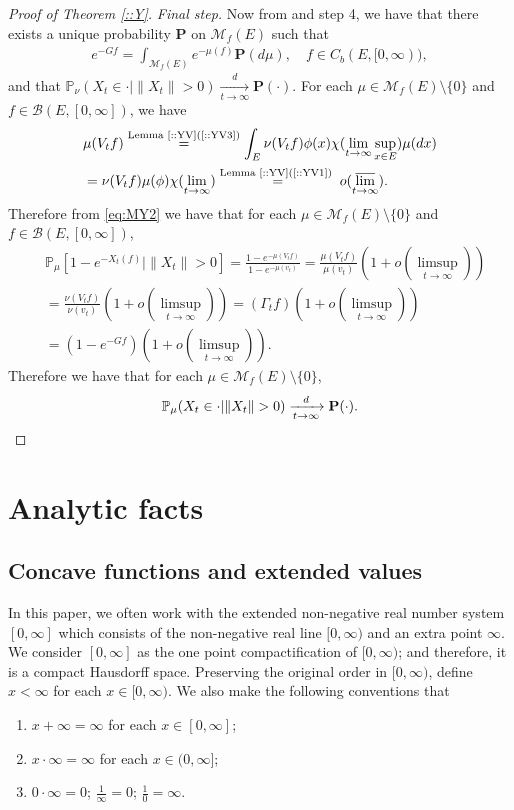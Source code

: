 \documentclass[12pt,a4paper]{amsart}
\numberwithin{equation}{section}
\theoremstyle{plain}
\theoremstyle{definition}
\theoremstyle{remark}
\begin{document}
\begin{proof}[Proof of Theorem \ref{::Y}]
\emph{Final step.}
Now from \cite[Proposition 1.19]{Li2011MeasureValued} and step 4, we have that there exists a unique probability $\mathbf P$ on $\mathcal M_f(E)$ such that 
\begin{align}
  e^{-Gf}
  = \int_{\mathcal M_f(E)} e^{- \mu(f)} \mathbf P(d\mu)
  , \quad f\in C_b (E, [0,\infty)),
\end{align}
and that
\(	
\mathbb P_{\nu}(X_t \in \cdot | \|X_t\|>0 ) 
  \xrightarrow[t\to \infty]{d} \mathbf P(\cdot).
\)
For each $\mu \in \mathcal M_f(E)\setminus \{0\}$ and $f \in \mathcal B(E,[0,\infty])$, we have 
\begin{align}
	& \mu(V_tf) 
   \overset{\text{Lemma \ref{::YV}(\ref{::YV3})}}=  \int_E \nu(V_tf) \phi(x) \chi(\lim_{t\to \infty}\sup_{x\in E}) \mu(dx)
   \\ &= \nu(V_tf) \mu(\phi)\chi(\lim_{t\to \infty})
   \overset{\text{Lemma \ref{::YV}(\ref{::YV1}) } }= o(\varlimsup_{t\to \infty}).
\end{align}
Therefore from \eqref{eq:MY2} we have that for each $\mu \in \mathcal M_f(E)\setminus\{0\}$ and $f\in \mathcal B(E,[0,\infty])$, 
\begin{align}
  &\mathbb P_\mu[1 - e^{-X_t(f)}|\|X_t\|>0]
  = \frac{1 - e^{- \mu(V_tf)}}{1 - e^{-\mu(v_t)}}
  = \frac{\mu(V_tf)}{\mu(v_t)} (1+o(\limsup_{t\to \infty}))
  \\&= \frac{\nu(V_tf)}{\nu(v_t)}(1+o(\limsup_{t\to \infty})) 
  = (\Gamma_t f)(1+o(\limsup_{t\to \infty}))
  \\ & = (1 - e^{-Gf}) (1+o(\limsup_{t\to \infty})).
\end{align}
Therefore we have that for each $\mu \in \mathcal M_f(E)\setminus\{0\}$,
\[
  \mathbb P_\mu(X_t \in \cdot | \|X_t\|>0)
  \xrightarrow[t\to \infty]{d} \mathbf P(\cdot).
  \qedhere
\]
\end{proof}

\appendix
\section{Analytic facts}
\subsection{Concave functions and extended values}
In this paper, we often work with the extended non-negative real number system $[0,\infty]$ which consists of the non-negative real line $[0,\infty)$ and an extra point $\infty$. 
We consider $[0,\infty]$ as the one point compactification of $[0,\infty)$; and therefore, it is a compact Hausdorff space.
Preserving the original order in $[0,\infty)$, define $x < \infty$ for each $x\in [0,\infty)$.
We also make the following conventions that 
\begin{enumerate}
\item
$x + \infty = \infty$ for each $x\in [0,\infty]$; 
\item
$x \cdot \infty = \infty$ for each $x\in (0,\infty]$;
\item
$0 \cdot \infty = 0$; $\frac{1}{\infty} = 0$; $\frac{1}{0} = \infty$.
\end{enumerate}
\end{document}
